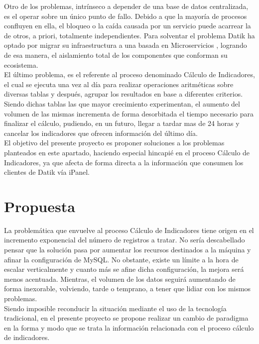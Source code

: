 Otro de los problemas, intrínseco a depender de una base de datos centralizada, es el operar sobre un único punto de fallo. Debido a que la mayoría de procesos confluyen en ella, el bloqueo o la caída causada por un servicio puede acarrear la de otros, a priori, totalmente independientes. Para solventar el problema Datik ha optado por migrar su infraestructura a una basada en Microservicios \cite{newman2015building}, logrando de esa manera, el aislamiento total de los componentes que conforman su ecosistema.\\ 

El último problema, es el referente al proceso denominado Cálculo de Indicadores, el cual se ejecuta una vez al día para realizar operaciones aritméticas sobre diversas tablas y después, agrupar los resultados en base a diferentes criterios. Siendo dichas tablas las que mayor crecimiento experimentan, el aumento del volumen de las mismas incrementa de forma desorbitada el tiempo necesario para finalizar el cálculo, pudiendo, en un futuro, llegar a tardar mas de 24 horas y cancelar los indicadores que ofrecen información del último día.\\

El objetivo del presente proyecto es proponer soluciones a los problemas planteados en este apartado, haciendo especial hincapié en el proceso Cálculo de Indicadores, ya que afecta de forma directa a la información que consumen los clientes de Datik vía iPanel.\\

\section{Propuesta}

La problemática que envuelve al proceso Cálculo de Indicadores tiene origen en el incremento exponencial del número de registros a tratar. No sería descabellado pensar que la solución pasa por aumentar los recursos destinados a la máquina y afinar la configuración de MySQL. No obstante, existe un límite a la hora de escalar verticalmente y cuanto más se afine dicha configuración, la mejora será menos acentuada. Mientras, el volumen de los datos seguirá aumentando de forma inexorable, volviendo, tarde o temprano, a tener que lidiar con los mismos problemas.\\

Siendo imposible reconducir la situación mediante el uso de la tecnología tradicional, en el presente proyecto se propone realizar un cambio de paradigma en la forma y modo que se trata la información relacionada con el proceso cálculo de indicadores.



